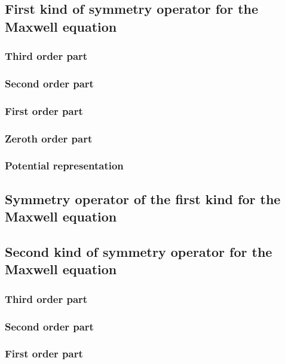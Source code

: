 \documentclass[a4paper, 10pt]{iopart}
\numberwithin{equation}{section}
\begin{document}
\subsection{First kind of symmetry operator for the Maxwell equation}
\subsubsection{Third order part}
\subsubsection{Second order part}
\subsubsection{First order part}
\subsubsection{Zeroth order part}
\subsubsection{Potential representation}
\subsection{Symmetry operator of the first kind for the Maxwell equation}
\subsection{Second kind of symmetry operator for the Maxwell equation}
\subsubsection{Third order part}
\subsubsection{Second order part}
\subsubsection{First order part}
\immediate{}
\end{document}
